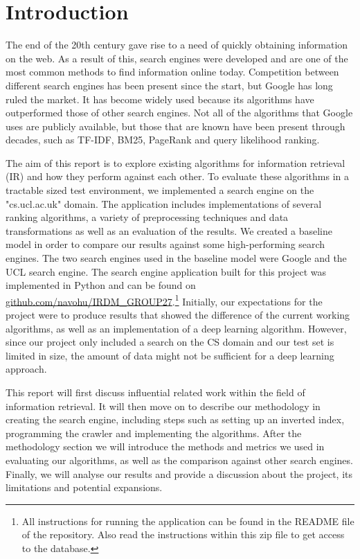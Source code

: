 \section{Introduction}

The end of the 20th century gave rise to a need of quickly obtaining information on the web. As a result of this, search engines were developed and are one of the most common methods to find information online today. Competition between different search engines has been present since the start, but Google has long ruled the market. It has become widely used because its algorithms have outperformed those of other search engines. Not all of the algorithms that Google uses are publicly available, but those that are known have been present through decades, such as TF-IDF, BM25, PageRank and query likelihood ranking.

The aim of this report is to explore existing algorithms for information retrieval (IR) and how they perform against each other. To evaluate these algorithms in a tractable sized test environment, we implemented a search engine on the "cs.ucl.ac.uk" domain. The application includes implementations of several ranking algorithms, a variety of preprocessing techniques and data transformations as well as an evaluation of the results. We created a baseline model in order to compare our results against some high-performing search engines. The two search engines used in the baseline model were Google and the UCL search engine. The search engine application built for this project was implemented in Python and can be found on \url{github.com/navohu/IRDM_GROUP27}.\footnote{All instructions for running the application can be found in the README file of the repository. Also read the instructions within this zip file to get access to the database.} Initially, our expectations for the project were to produce results that showed the difference of the current working algorithms, as well as an implementation of a deep learning algorithm. However, since our project only included a search on the CS domain and our test set is limited in size, the amount of data might not be sufficient for a deep learning approach.

This report will first discuss influential related work within the field of information retrieval. It will then move on to describe our methodology in creating the search engine, including steps such as setting up an inverted index, programming the crawler and implementing the algorithms. After the methodology section we will introduce the methods and metrics we used in evaluating our algorithms, as well as the comparison against other search engines. Finally, we will analyse our results and provide a discussion about the project, its limitations and potential expansions.

